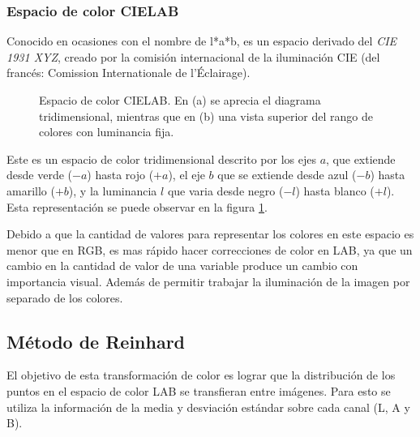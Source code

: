 \subsubsection*{Espacio de color CIELAB}

Conocido en ocasiones con el nombre de l*a*b, es un espacio derivado del \textit{CIE 1931 XYZ}, creado por la comisión internacional de la iluminación CIE (del francés: Comission Internationale de l'Éclairage).

\begin{figure}[h]
	\centering     %
	
	\caption[Espacio de color CIELAB]{Espacio de color CIELAB. En (a) se aprecia el diagrama tridimensional, mientras que en (b) una vista superior del rango de colores con luminancia fija.}
	\label{imagen:lab-color}
\end{figure}

Este es un espacio de color tridimensional descrito por los ejes $a$, que extiende desde verde ($-a$) hasta rojo ($+a$), el eje $b$ que se extiende desde azul ($-b$) hasta amarillo ($+b$), y la luminancia $l$ que varia desde negro ($-l$) hasta blanco ($+l$). Esta representación se puede observar en la figura \ref{imagen:lab-color}.

Debido a que la cantidad de valores para representar los colores en este espacio es menor que en RGB, es mas rápido hacer correcciones de color en LAB, ya que un cambio en la cantidad de valor de una variable produce un cambio con importancia visual. Además de permitir trabajar la iluminación de la imagen por separado de los colores.

\subsection{Método de Reinhard}
El objetivo de esta transformación de color es lograr que la distribución de los puntos en el espacio de color LAB se transfieran entre imágenes. Para esto se utiliza la información de la media y desviación estándar sobre cada canal (L, A y B).

